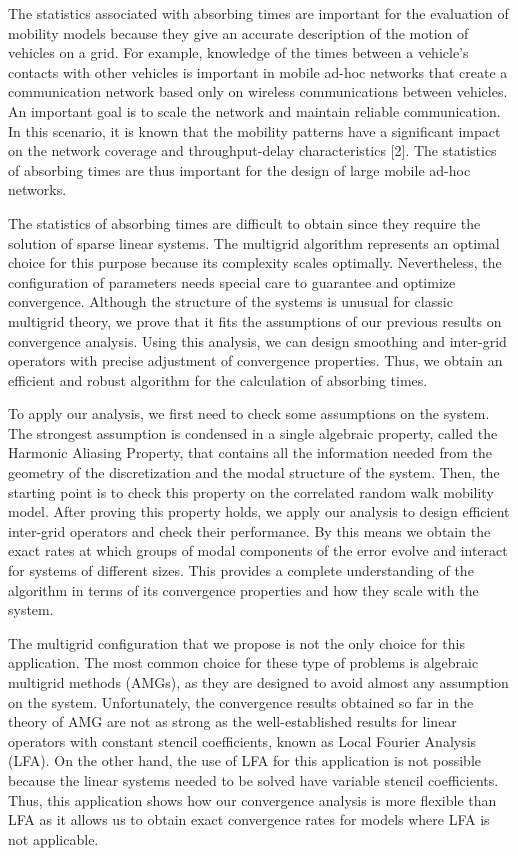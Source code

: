 \documentclass{report}
\begin{document}
The statistics associated with absorbing times are important for the
evaluation of mobility models because they give an accurate description
of the motion of vehicles on a grid. For example, knowledge of the times
between a vehicle's contacts with other vehicles is important in mobile
ad-hoc networks that create a communication network based only on
wireless communications between vehicles. An important goal is to scale
the network and maintain reliable communication. In this scenario, it is
known that the mobility patterns have a significant impact on the network
coverage and throughput-delay characteristics [2]. The statistics of
absorbing times are thus important for the design of large mobile ad-hoc
networks.

The statistics of absorbing times are difficult to obtain since they
require the solution of sparse linear systems. The multigrid algorithm
represents an optimal choice for this purpose because its complexity
scales optimally. Nevertheless, the configuration of parameters needs
special care to guarantee and optimize convergence. Although the
structure of the systems is unusual for classic multigrid theory, we
prove that it fits the assumptions of our previous results on convergence
analysis. Using this analysis, we can design smoothing and inter-grid
operators with precise adjustment of convergence properties. Thus, we
obtain an efficient and robust algorithm for the calculation of absorbing
times.

To apply our analysis, we first need to check some assumptions on the
system. The strongest assumption is condensed in a single algebraic
property, called the Harmonic Aliasing Property, that contains all the
information needed from the geometry of the discretization and the modal
structure of the system. Then, the starting point is to check this
property on the correlated random walk mobility model. After proving this
property holds, we apply our analysis to design efficient inter-grid
operators and check their performance. By this means we obtain the exact
rates at which groups of modal components of the error evolve and
interact for systems of different sizes. This provides a complete
understanding of the algorithm in terms of its convergence properties and
how they scale with the system.

The multigrid configuration that we propose is not the only choice for
this application. The most common choice for these type of problems is
algebraic multigrid methods (AMGs), as they are designed to avoid almost
any assumption on the system. Unfortunately, the convergence results
obtained so far in the theory of AMG are not as strong as the
well-established results for linear operators with constant stencil
coefficients, known as Local Fourier Analysis (LFA). On the other hand,
the use of LFA for this application is not possible because the linear
systems needed to be solved have variable stencil coefficients. Thus,
this application shows how our convergence analysis is more flexible than
LFA as it allows us to obtain exact convergence rates for models where
LFA is not applicable.
\end{document}

